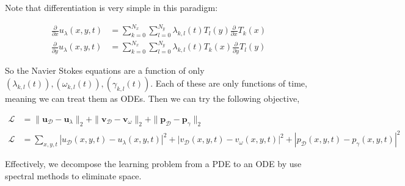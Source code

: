 \documentclass[12pt]{article}
\begin{document}
Note that differentiation is very simple in this paradigm:

\begin{align}
    \frac{\partial}{\partial x} u_\lambda(x,y,t) &= \sum_{k=0}^{N_x}\sum_{l=0}^{N_y} \lambda_{k,l}(t)T_l(y) \frac{\partial}{\partial x} T_k(x) \\
    \frac{\partial}{\partial y} u_\lambda(x,y,t) &= \sum_{k=0}^{N_x}\sum_{l=0}^{N_y} \lambda_{k,l}(t)T_k(x)\frac{\partial}{\partial y} T_l(y)
\end{align}

\noindent So the Navier Stokes equations are a function of only $(\lambda_{k,l}(t)), (\omega_{k,l}(t)), (\gamma_{k,l}(t))$. Each of these are only functions of time, meaning we can treat them as ODEs. Then we can try the following objective,

\begin{align}
\mathcal{L} &= \| \mathbf{u}_{\mathcal{D}} - \mathbf{u}_\lambda \|_2 + \| \mathbf{v}_{\mathcal{D}} - \mathbf{v}_\omega \|_2 + \| \mathbf{p}_{\mathcal{D}} - \mathbf{p}_\gamma \|_2\\
\mathcal{L} &= \sum_{x,y,t} |u_{\mathcal{D}}(x,y,t) - u_\lambda(x,y,t)|^2 + |v_{\mathcal{D}}(x,y,t) - v_\omega(x,y,t)|^2 + |p_{\mathcal{D}}(x,y,t) - p_\gamma(x,y,t)|^2
\end{align}

\noindent Effectively, we decompose the learning problem from a PDE to an ODE by use spectral methods to eliminate space.
\end{document}
